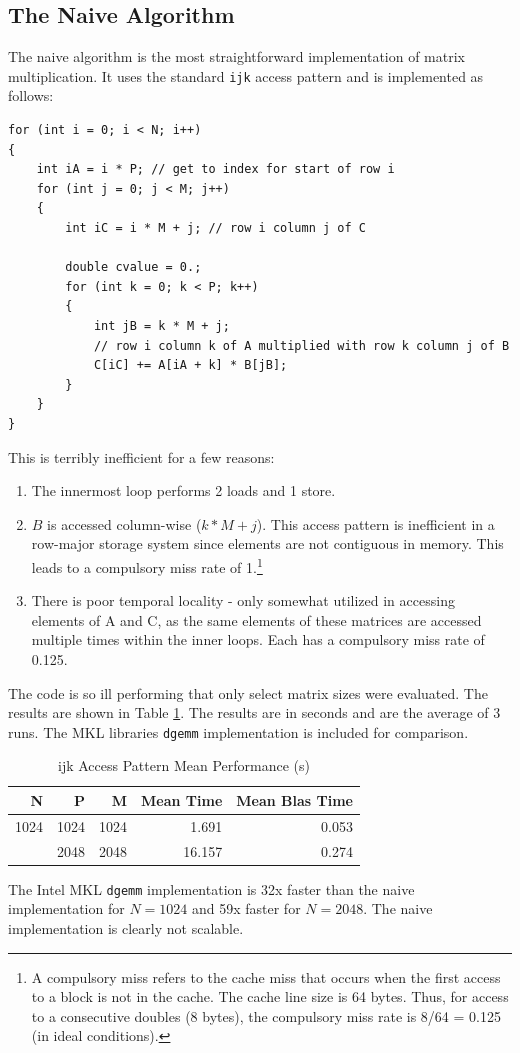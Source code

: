 \documentclass{article}
\begin{document}
\subsection{The Naive Algorithm}
The naive algorithm is the most straightforward implementation of matrix multiplication. 
It uses the standard \texttt{ijk} access pattern and is implemented as follows:
\begin{lstlisting}
for (int i = 0; i < N; i++)
{
    int iA = i * P; // get to index for start of row i
    for (int j = 0; j < M; j++)
    {
        int iC = i * M + j; // row i column j of C

        double cvalue = 0.;
        for (int k = 0; k < P; k++)
        {
            int jB = k * M + j;
            // row i column k of A multiplied with row k column j of B
            C[iC] += A[iA + k] * B[jB];
        }
    }
}
\end{lstlisting}
\noindent This is terribly inefficient for a few reasons:
\begin{enumerate}
    \item The innermost loop performs 2 loads and 1 store.
    \item $B$ is accessed column-wise (\(k * M + j\)). This access pattern is inefficient in a row-major storage system since elements are not contiguous in memory. This leads to a compulsory miss rate of 1.\footnote{
        A compulsory miss refers to the cache miss that occurs when the first access to a block is not in the cache. The cache line size is 64 bytes. Thus, for access 
        to a consecutive doubles (8 bytes), the compulsory miss rate is 8/64 = 0.125 (in ideal conditions).
    }
    \item There is poor temporal locality - only somewhat utilized in accessing elements of A and C, as the same elements of these matrices are accessed multiple times within the inner loops. Each has a compulsory miss rate of 0.125.
\end{enumerate}
The code is so ill performing that only select matrix sizes were evaluated. The 
results are shown in Table \ref{TAB:NAIVE-RESULTS}. The results are in seconds and
are the average of 3 runs. The MKL libraries \texttt{dgemm} implementation is included for comparison. 
\begin{table}[H]
    \centering
    \caption{ijk Access Pattern Mean Performance (s)}
    \begin{tabular}[t]{rrrrr}
    \toprule
    N & P & M & Mean Time & Mean Blas Time\\
    \midrule
    1024 & 1024 & 1024 & 1.691 & 0.053\\
    \addlinespace
    2048 & 2048 & 2048 & 16.157 & 0.274\\
    \bottomrule
    \end{tabular}
    \label{TAB:NAIVE-RESULTS}
\end{table}
\noindent The Intel MKL \texttt{dgemm} implementation is 32x faster than the naive implementation for $N = 1024$ and 59x faster for $N = 2048$. The naive implementation is clearly not scalable.
\end{document}
